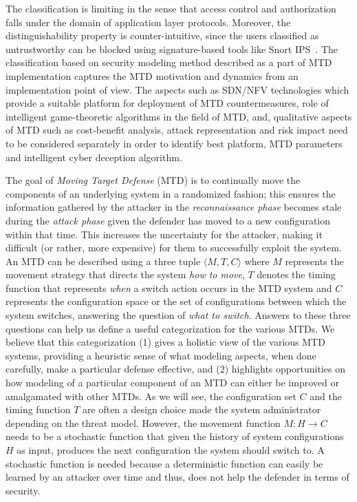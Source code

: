  The classification is limiting in the sense that access control and authorization falls under the domain of application layer protocols. Moreover, the distinguishability property is counter-intuitive, since the users classified as untrustworthy can be blocked using signature-based tools like Snort IPS~. 
The classification based on security modeling method described as a part of MTD implementation captures the MTD motivation and dynamics from an implementation point of view. The aspects such as SDN/NFV technologies which provide a suitable platform for deployment of MTD countermeasures, role of intelligent game-theoretic algorithms in the field of MTD, and, qualitative aspects of MTD such as cost-benefit analysis, attack representation and risk impact need to be considered separately in order to identify best platform, MTD parameters and intelligent cyber deception algorithm. 
\fi

\label{sec:mtd}
The goal of \emph{Moving Target Defense} (MTD) is to continually move the components of an underlying system in a randomized fashion; this ensures the information gathered by the attacker in the \emph{reconnaissance phase} becomes stale during the \emph{attack phase} given the defender has moved to a new configuration within that time. This increases the uncertainty for the attacker, making it difficult (or rather, more expensive) for them to successfully exploit the system.
An MTD can be described using a three tuple $\langle M, T, C \rangle$ where $M$ represents the movement strategy that directs the system {\em how to move}, $T$ denotes the timing function that represents {\em when} a switch action occurs in the MTD system and $C$ represents the configuration space or the set of configurations between which the system switches, answering the question of {\em what to switch}. Answers to these three questions can help us define a useful categorization for the various MTDs. We believe that this categorization (1) gives a holistic view of the various MTD systems, providing a heuristic sense of what modeling aspects, when done carefully, make a particular defense effective, and (2) highlights opportunities on how modeling of a particular component of an MTD can either be improved or amalgamated with other MTDs.
As we will see, the configuration set $C$ and the timing function $T$ are often a design choice made the system administrator depending on the threat model. However, the movement function $M: H \rightarrow C$ needs to be a stochastic function that given the history of system configurations $H$ as input, produces the next configuration the system should switch to. A stochastic function is needed because a deterministic function can easily be learned by an attacker over time and thus, does not help the defender in terms of security.

